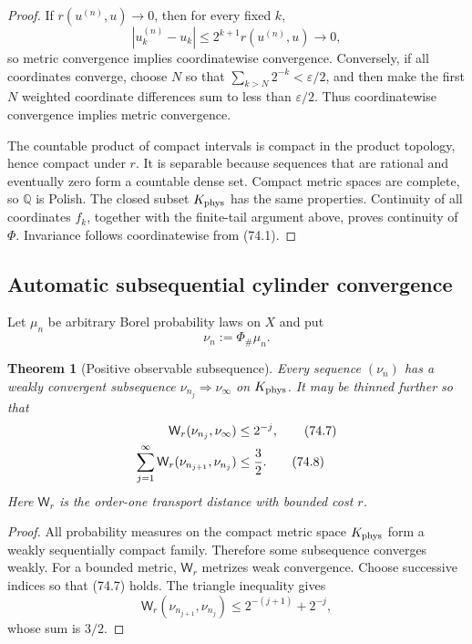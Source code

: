 \documentclass[11pt]{article}
\newtheorem{theorem}{Theorem}[section]
\theoremstyle{remark}
\begin{document}
\begin{proof}
If \(r(u^{(n)},u)\to0\), then for every fixed \(k\),
\[
 |u_k^{(n)}-u_k|
 \leq2^{k+1}r(u^{(n)},u)\longrightarrow0,
\]
so metric convergence implies coordinatewise convergence.
Conversely, if all coordinates converge, choose \(N\) so that
\(\sum_{k>N}2^{-k}<\varepsilon/2\), and then make the first \(N\)
weighted coordinate differences sum to less than
\(\varepsilon/2\).  Thus coordinatewise convergence implies metric
convergence.

The countable product of compact intervals is compact in the product
topology, hence compact under \(r\).  It is separable because
sequences that are rational and eventually zero form a countable
dense set.  Compact metric spaces are complete, so \(\mathbb Q\) is
Polish.  The closed subset \(K_{\rm phys}\) has the same properties.
Continuity of all coordinates \(f_k\), together with the finite-tail
argument above, proves continuity of \(\Phi\).  Invariance follows
coordinatewise from (74.1).
\end{proof}

\subsection{Automatic subsequential cylinder convergence}

Let \(\mu_n\) be arbitrary Borel probability laws on \(X\) and put
\begin{equation}
                         \nu_n:=\Phi_\#\mu_n.                 \tag{74.6}
\end{equation}

\begin{theorem}[Positive observable subsequence]
\label{thm:v12v74-subsequence}
Every sequence \((\nu_n)\) has a weakly convergent subsequence
\(\nu_{n_j}\Rightarrow\nu_\infty\) on \(K_{\rm phys}\).  It may be
thinned further so that
\begin{align}
 {\mathsf W}_r(\nu_{n_j},\nu_\infty)&\leq2^{-j},              \tag{74.7}\\
 \sum_{j=1}^{\infty}
 {\mathsf W}_r(\nu_{n_{j+1}},\nu_{n_j})&\leq{3\over2}.        \tag{74.8}
\end{align}
Here \({\mathsf W}_r\) is the order-one transport distance with
bounded cost \(r\).
\end{theorem}

\begin{proof}
All probability measures on the compact metric space
\(K_{\rm phys}\) form a weakly sequentially compact family.
Therefore some subsequence converges weakly.  For a bounded metric,
\({\mathsf W}_r\) metrizes weak convergence.  Choose successive
indices so that (74.7) holds.  The triangle inequality gives
\[
 {\mathsf W}_r(\nu_{n_{j+1}},\nu_{n_j})
 \leq2^{-(j+1)}+2^{-j},
\]
whose sum is \(3/2\).
\end{proof}
\end{document}
